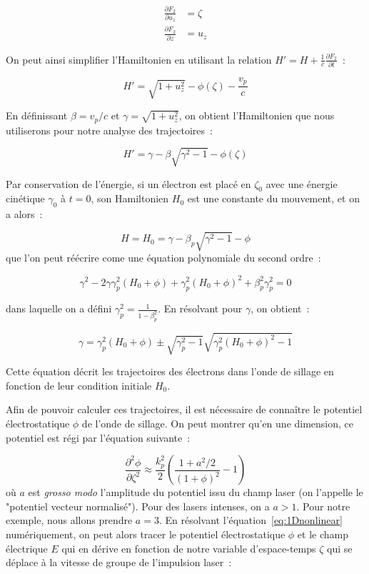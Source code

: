 \documentclass[a4paper]{book}
\begin{document}
\begin{eqnarray*}
    \frac{\partial F_2}{\partial u_z}&=\zeta\\
    \frac{\partial F_2}{\partial z}&=u_z
\end{eqnarray*}

On peut ainsi simplifier l'Hamiltonien en utilisant la relation $H' = H+\frac{1}{c}\frac{\partial F_2}{\partial t}$~:

\begin{equation}
    H'=\sqrt{1+u_z^2}-\phi(\zeta)-\frac{v_p}{c}
\end{equation}

En définissant $\beta=v_p/c$ et $\gamma=\sqrt{1+u_z^2}$, on obtient l'Hamiltonien que nous utiliserons pour notre analyse des trajectoires~:

\begin{equation}
    H'=\gamma-\beta\sqrt{\gamma^2-1}-\phi(\zeta)
\end{equation}

Par conservation de l'énergie, si un électron est placé en $\zeta_0$ avec une énergie cinétique $\gamma_0$ à $t=0$, son Hamiltonien $H_0$ est une constante du mouvement, et on a alors~:

\begin{equation*}
H=H_0=\gamma -\beta_p\sqrt{\gamma^2-1}-\phi
\end{equation*}
que l'on peut réécrire come une équation polynomiale du second ordre~:

\begin{equation*}
\gamma^2-2\gamma\gamma_p^2(H_0+\phi)+\gamma_p^2(H_0+\phi)^2+\beta_p^2\gamma_p^2=0
\end{equation*}

 dans laquelle on a défini $\gamma_p^2=\frac{1}{1-\beta_p^2}$. En résolvant pour $\gamma$, on obtient~:

\begin{equation}\label{eqsol}
\gamma=\gamma_p^2(H_0+\phi)\pm\sqrt{\gamma_p^2-1}\sqrt{\gamma_p^2(H_0+\phi)^2-1}
\end{equation}

Cette équation décrit les trajectoires des électrons dans l'onde de sillage en fonction de leur condition initiale $H_0$. 

Afin de pouvoir calculer ces trajectoires, il est nécessaire de connaître le potentiel électrostatique $\phi$ de l'onde de sillage. On peut montrer qu'en une dimension, ce potentiel est régi par l'équation suivante~:

\begin{equation}
    \frac{\partial^2 \phi}{\partial \zeta ^2 }\approx\frac{k_p^2}{2}\left(\frac{1+a^2/2}{(1+\phi)^2}-1\right)
    \label{eq:1Dnonlinear}
\end{equation}
où $a$ est \textit{grosso modo} l'amplitude du potentiel issu du champ laser (on l'appelle le "potentiel vecteur normalisé"). Pour des lasers intenses, on a $a>1$. Pour notre exemple, nous allons prendre $a=3$. En résolvant l'équation~\ref{eq:1Dnonlinear} numériquement, on peut alors tracer le potentiel électrostatique $\phi$ et le champ électrique $E$ qui en dérive en fonction de notre variable d'espace-temps $\zeta$ qui se déplace à la vitesse de groupe de l'impulsion laser~: 
\end{document}

